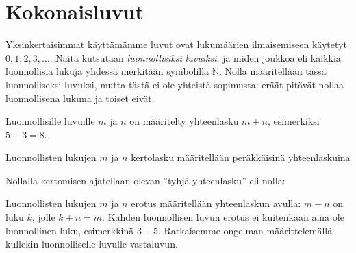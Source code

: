 
% 
% 
% 


% 
% 
% 

\section*{Kokonaisluvut}

Yksinkertaisimmat käyttämämme luvut ovat lukumäärien ilmaisemiseen käytetyt $0, 1, 2, 3, \ldots$. Näitä kutsutaan \emph{luonnollisiksi luvuiksi}, ja niiden joukkoa eli kaikkia luonnollisia lukuja yhdessä merkitään symbolilla $\mathbb{N}$.
Nolla määritellään tässä luonnolliseksi luvuksi, mutta tästä ei ole yhteistä sopimusta: eräät pitävät nollaa luonnollisena lukuna ja toiset eivät.

Luonnollisille luvuille $m$ ja $n$ on määritelty yhteenlasku $m + n$, esimerkiksi $5 + 3 = 8$.

Luonnollisten lukujen $m$ ja $n$ kertolasku määritellään peräkkäisinä yhteenlaskuina
\laatikko{
\[m \cdot n = \underbrace{m + m + \ldots + m}_{n\text{ kpl}} = \underbrace{n + n + \ldots + n}_{m\text{ kpl}}.\]
}

Nollalla kertomisen ajatellaan olevan ''tyhjä yhteenlasku'' eli nolla:

\laatikko{
\[0 \cdot m = 0\]
}

Luonnollisten lukujen $m$ ja $n$ erotus määritellään yhteenlaskun avulla:
$m-n$ on luku $k$, jolle $k + n = m$. Kahden luonnollisen luvun erotus
ei kuitenkaan aina ole luonnollinen luku, esimerkkinä $3 - 5$.
Ratkaisemme ongelman määrittelemällä kullekin luonnolliselle
luvulle vastaluvun.

